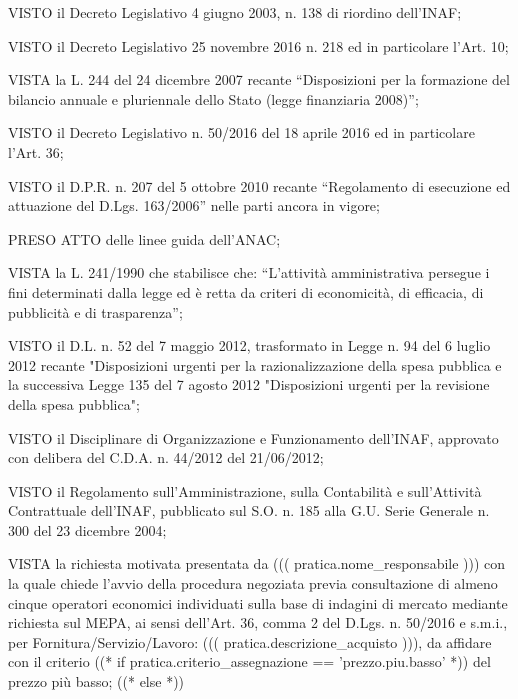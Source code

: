 \documentclass[a4paper,12pt]{letter}
\begin{document}
\begin{list}{VALUTATA}{}
\item[VISTO] il Decreto Legislativo 4 giugno 2003, n. 138 di riordino dell'INAF;
\item[VISTO] il Decreto Legislativo 25 novembre 2016 n. 218 ed in particolare l'Art. 10;
\item[VISTA] la L. 244 del 24 dicembre 2007 recante ``Disposizioni per la formazione 
        del bilancio annuale e pluriennale dello Stato (legge finanziaria 2008)''; 
\item[VISTO]  il Decreto Legislativo n. 50/2016 del 18 aprile 2016 ed in particolare
      l'Art. 36;
\item[VISTO] il D.P.R. n. 207 del 5 ottobre 2010 recante ``Regolamento di esecuzione 
        ed attuazione del D.Lgs. 163/2006'' nelle parti ancora in vigore; 
\item[PRESO ATTO] delle linee guida dell'ANAC;
\item[VISTA] la L. 241/1990 che stabilisce che: ``L'attività amministrativa persegue i 
        fini determinati dalla legge ed è retta da criteri di economicità, di 
        efficacia, di pubblicità e di trasparenza'';
\item[VISTO] il D.L. n. 52 del 7 maggio 2012, trasformato in Legge n. 94 del 6 luglio 2012 
        recante "Disposizioni urgenti per la razionalizzazione della spesa pubblica 
        e la successiva Legge 135 del 7 agosto 2012 "Disposizioni urgenti per la 
        revisione della spesa pubblica"; 
\item[VISTO] il Disciplinare di Organizzazione e Funzionamento dell'INAF, approvato
        con delibera del C.D.A. n. 44/2012 del 21/06/2012;
\item[VISTO] il Regolamento sull'Amministrazione, sulla Contabilità e sull'Attività 
        Contrattuale dell'INAF, pubblicato sul S.O. n. 185 alla G.U. Serie Generale 
        n. 300 del 23 dicembre 2004;   
\item[VISTA] la richiesta motivata presentata da ((( pratica.nome_responsabile )))
        con la quale chiede l'avvio della procedura negoziata previa consultazione
        di almeno cinque operatori economici individuati sulla base di indagini di 
        mercato mediante richiesta sul MEPA, ai sensi dell'Art. 36, comma 2 del
        D.Lgs. n. 50/2016 e s.m.i., per Fornitura/Servizio/Lavoro: ((( pratica.descrizione_acquisto ))),
        da affidare con il criterio %
   ((* if pratica.criterio_assegnazione == 'prezzo.piu.basso' *)) %
del prezzo più basso;
   ((* else *)) %

\end{list}
\end{document}

